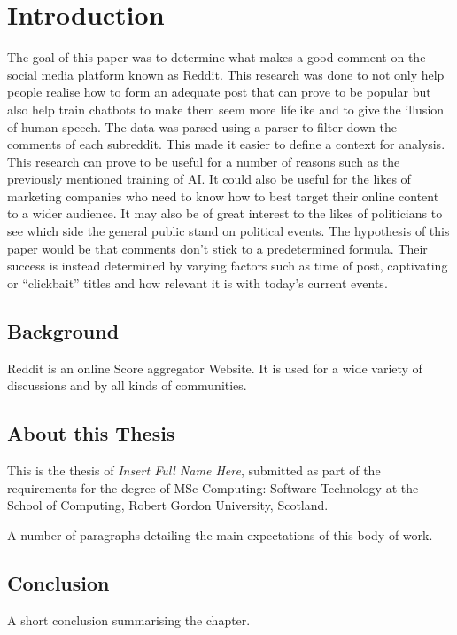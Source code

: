 \chapter{Introduction}
 \setcounter{page}{1}

The goal of this paper was to determine what makes a good comment on the social media platform known as Reddit. This research was done to not only help people realise how to form an adequate post that can prove to be popular but also help train chatbots to make them seem more lifelike and to give the illusion of human speech. The data was parsed using a parser to filter down the comments of each subreddit. This made it easier to define a context for analysis. This research can prove to be useful for a number of reasons such as the previously mentioned training of AI. It could also be useful for the likes of marketing companies who need to know how to best target their online content to a wider audience. It may also be of great interest to the likes of politicians to see which side the general public stand on political events. The hypothesis of this paper would be that comments don’t stick to a predetermined formula. Their success is instead determined by varying factors such as time of post, captivating or “clickbait” titles and how relevant it is with today's current events.


\section{Background}

Reddit is an online Score aggregator Website. It is used for a wide variety of discussions and by all kinds of communities.

\section{About this Thesis}
This is the thesis of \emph{Insert Full Name Here}, submitted as part of the requirements for the degree of MSc Computing: Software Technology at the School of Computing, Robert Gordon University, Scotland.

A number of paragraphs detailing the main expectations of this body of work.


\section{Conclusion}
A short conclusion summarising the chapter.
